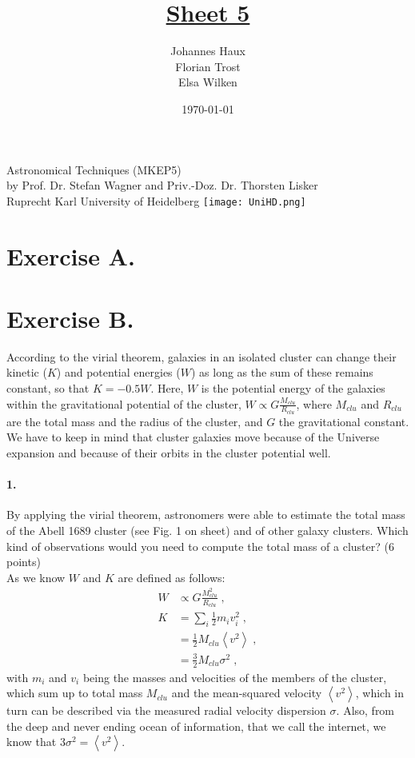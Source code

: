 \documentclass[11pt,a4paper,twoside]{article}
\title{\LARGE \underline {Sheet 5}}
\author{Johannes Haux \\ Florian Trost \\ Elsa Wilken}
\date{\today}
\begin{document}
\maketitle
\thispagestyle{empty}

\begin{center}
  Astronomical Techniques (MKEP5) \\
  \baselineskip35pt
  by Prof. Dr. Stefan Wagner and Priv.-Doz. Dr. Thorsten Lisker \\
  \baselineskip60pt
  Ruprecht Karl University of Heidelberg
\vskip 40pt
\texttt{[image: UniHD.png]}

\end{center}

\newpage
\setcounter{page}{1}		%

\section*{Exercise A.}

\section*{Exercise B.}

According to the virial theorem, galaxies in an isolated cluster can change
their kinetic ($K$) and potential energies ($W$) as long as the sum of these 
remains constant, so that $K = -0.5W$. Here, $W$ is the potential energy of the 
galaxies within the gravitational potential of the cluster, $W \propto 
G \frac{M_{clu}}{R_{clu}}$, where $M_{clu}$ and $R_{clu}$ are the total mass and 
the radius of the cluster, and $G$ the gravitational constant. We have to keep 
in mind that cluster galaxies move because of the Universe expansion and 
because of their orbits in the cluster potential well. \\

\paragraph{1.} By applying the virial theorem, astronomers were able to 
estimate the total mass of the Abell 1689 cluster (see Fig. 1 on sheet) and of 
other galaxy clusters. Which kind of observations would you need to compute 
the total mass of a cluster? (6 points) \\

As we know $W$ and $K$ are defined as follows:
\begin{align}
    W &\propto G \frac{M_{clu}^2}{R_{clu}}\;, \\
    K &= \sum_i \frac{1}{2}m_iv_i^2\;,\\
    &= \frac{1}{2} M_{clu} \left< v^2\right> \;, \\
    &= \frac{3}{2} M_{clu} \sigma^2\;,
\end{align}
with $m_i$ and $v_i$ being the masses and velocities of the members of the
cluster, which sum up to total mass $M_{clu}$ and the mean-squared velocity
$\left< v^2 \right>$, which in turn can be described via the measured radial
velocity dispersion $\sigma$. Also, from the deep and never ending ocean of
information, that we call the internet, we know that 
$3\sigma^2 = \left<v^2\right>$.
\end{document}

